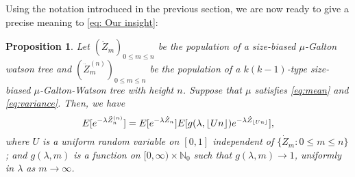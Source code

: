 \documentclass[12pt,a4paper]{amsart}
\DeclarePairedDelimiter\floor{\lfloor}{\rfloor}
\newtheorem{prop}[thm]{Proposition}
\numberwithin{equation}{section}
\begin{document}
	Using the	notation
	introduced in the previous	section, we are now ready to
	give a precise meaning to \eqref{eq: Our insight}:
\begin{prop}\label{prop: size-biased add-on of size-biased tree }
	Let $(\dot Z_m)_{0 \leq m \leq n}$ be the population of a size-biased $\mu$-Galton watson tree and $(\ddot Z^{(n)}_m)_{0 \leq m \leq n}$ be the population of a $k(k-1)$-type size-biased $\mu$-Galton-Watson tree with height $n$.
	Suppose that $\mu$ satisfies \eqref{eq:mean} and \eqref{eq:variance}.
	Then, we have
\[
	E [ e^{- \lambda \ddot Z_n^{(n)}} ]
	= E [e^{-\lambda \dot Z_n}] E[g(\lambda, \floor{Un})e^{-\lambda \dot Z_{\floor{Un}}}],
\]
where $U$ is a uniform random variable on $[0,1]$ independent of $\{\dot Z_m: 0\le m\le n\}$;
and $g(\lambda, m)$ is a function on $[0,\infty) \times \mathbb N_0$ such that
$g(\lambda, m) \to 1$, uniformly in $\lambda$ as $m\to \infty$.
\end{prop}
\end{document}
